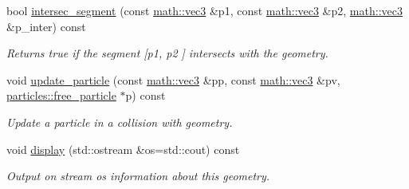 \begin{DoxyCompactItemize}
bool \hyperlink{classphysim_1_1geom_1_1rectangle_a574bb5afdcd7c6afca0bd5948e1f37a9}{intersec\+\_\+segment} (const \hyperlink{structphysim_1_1math_1_1vec3}{math\+::vec3} \&p1, const \hyperlink{structphysim_1_1math_1_1vec3}{math\+::vec3} \&p2, \hyperlink{structphysim_1_1math_1_1vec3}{math\+::vec3} \&p\+\_\+inter) const
\begin{DoxyCompactList}\small\item\em Returns true if the segment \mbox{[}{\itshape p1}, {\itshape p2} \mbox{]} intersects with the geometry. \end{DoxyCompactList}\item 
void \hyperlink{classphysim_1_1geom_1_1rectangle_adb8cbc4dfa566b8174f2cf25bbc90afe}{update\+\_\+particle} (const \hyperlink{structphysim_1_1math_1_1vec3}{math\+::vec3} \&pp, const \hyperlink{structphysim_1_1math_1_1vec3}{math\+::vec3} \&pv, \hyperlink{classphysim_1_1particles_1_1free__particle}{particles\+::free\+\_\+particle} $\ast$p) const
\begin{DoxyCompactList}\small\item\em Update a particle in a collision with geometry. \end{DoxyCompactList}\item 
\mbox{\label{classphysim_1_1geom_1_1rectangle_a6d4d4b1bc6aadb66b0f79abbc45ede7b}} 
void \hyperlink{classphysim_1_1geom_1_1rectangle_a6d4d4b1bc6aadb66b0f79abbc45ede7b}{display} (std\+::ostream \&os=std\+::cout) const
\begin{DoxyCompactList}\small\item\em Output on stream {\itshape os} information about this geometry. \end{DoxyCompactList}\end{DoxyCompactItemize}
